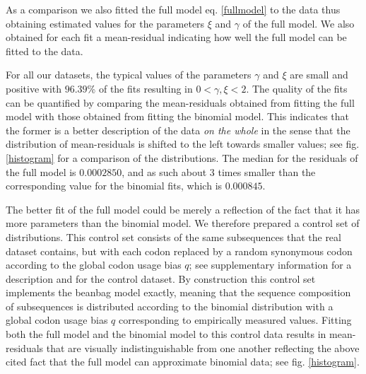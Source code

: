 \documentclass[a4paper,10pt]{paper}%
\begin{document}
As a comparison we  also  fitted the full model eq. \ref{fullmodel} to the data  thus obtaining   estimated values for  the parameters $\xi$ and $\gamma$ of the full model. We also obtained  for each fit a   mean-residual indicating how well the full model can be fitted to the data.
%
%
%
\par
For all our datasets, the typical values of the parameters $\gamma$ and $\xi$ are small and  positive  with  $96.39$\% of the fits resulting  in  $0<\gamma,\xi<2$.  The quality of the fits can be quantified by comparing the mean-residuals obtained from  fitting the  full model with those obtained from fitting the binomial model. This   indicates that the former is a better description of the data {\em on the whole} in the sense that the distribution of mean-residuals is  shifted to the left towards smaller values; see fig. \ref{histogram} for a comparison of the distributions.  The median for the  residuals of the full model is  $0.0002850$, and as such about 3 times smaller than the corresponding value for the binomial fits, which is $0.000845$. 
\par
The   better fit of the full model could be  merely a reflection of the fact that it has  more  parameters than the  binomial model. We therefore   prepared a control set of  distributions. This control set consists of the same subsequences that the real dataset contains, but with each codon replaced by a random synonymous codon according to the global codon usage bias $q$; see supplementary information for a description and for the control dataset. By construction this control set implements the beanbag model exactly, meaning  that the  sequence composition of subsequences is distributed according to the binomial distribution  with a global  codon usage bias $q$ corresponding to empirically measured values.   Fitting both the full model and the binomial model to this control data results in mean-residuals that are  visually indistinguishable from one another reflecting the above cited fact that the full model can approximate binomial data; see  fig. \ref{histogram}.  
\end{document}
